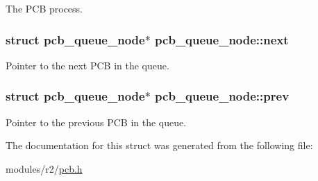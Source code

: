 The P\+CB process. 

\subsubsection[{\texorpdfstring{next}{next}}]{\setlength{\rightskip}{0pt plus 5cm}struct {\bf pcb\+\_\+queue\+\_\+node}$\ast$ pcb\+\_\+queue\+\_\+node\+::next}\hypertarget{structpcb__queue__node_a6634871cb99f4f53fed51e9b51f6852c}{}\label{structpcb__queue__node_a6634871cb99f4f53fed51e9b51f6852c}


Pointer to the next P\+CB in the queue. 

\subsubsection[{\texorpdfstring{prev}{prev}}]{\setlength{\rightskip}{0pt plus 5cm}struct {\bf pcb\+\_\+queue\+\_\+node}$\ast$ pcb\+\_\+queue\+\_\+node\+::prev}\hypertarget{structpcb__queue__node_aff49de430038d879a5a58105aa1544d5}{}\label{structpcb__queue__node_aff49de430038d879a5a58105aa1544d5}


Pointer to the previous P\+CB in the queue. 



The documentation for this struct was generated from the following file\+:\begin{DoxyCompactItemize}
\item 
modules/r2/\hyperlink{pcb_8h}{pcb.\+h}\end{DoxyCompactItemize}
